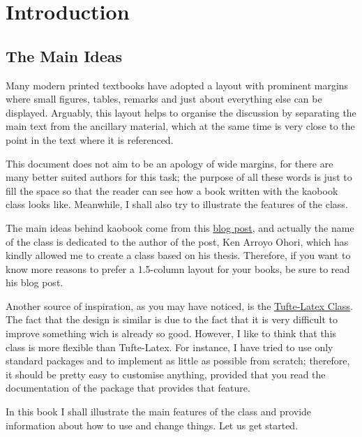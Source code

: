 \setchapterpreamble[u]{\margintoc}
\chapter{Introduction}

\section{The Main Ideas}

Many modern printed textbooks have adopted a layout with prominent 
margins where small figures, tables, remarks and just about everything 
else can be displayed. Arguably, this layout helps to organise the 
	discussion by separating the main text from the ancillary material, 
	which at the same time is very close to the point in the text where 
	it is referenced.

This document does not aim to be an apology of wide margins, for there 
are many better suited authors for this task; the purpose of all these 
words is just to fill the space so that the reader can see how a book 
written with the kaobook class looks like. Meanwhile, I shall also try 
to illustrate the features of the class.

The main ideas behind kaobook come from this 
\href{https://3d.bk.tudelft.nl/ken/en/2016/04/17/a-1.5-column-layout-in-latex.html}{blog 
	post}, and actually the name of the class is dedicated to the author 
of the post, Ken Arroyo Ohori, which has kindly allowed me to create a 
class based on his thesis. Therefore, if you want to know more reasons 
to prefer a 1.5-column layout for your books, be sure to read his blog 
post.

Another source of inspiration, as you may have noticed, is the 
\href{https://github.com/Tufte-LaTeX/tufte-latex}{Tufte-Latex Class}. 
The fact that the design is similar is due to the fact that it is very 
difficult to improve something wich is already so good. However, I like 
to think that this class is more flexible than Tufte-Latex. For 
instance, I have tried to use only standard packages and to implement as 
little as possible from scratch; therefore, it should be pretty easy 
to customise anything, provided that you read the documentation of the 
package that provides that feature.

In this book I shall illustrate the main features of the class and 
provide information about how to use and change things. Let us get 
started.

